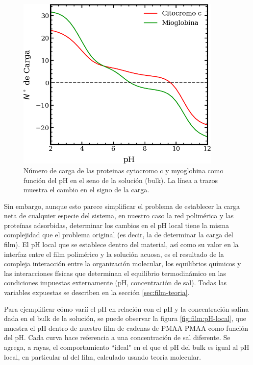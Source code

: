 \begin{figure}
    \centering
    \includegraphics[width=0.9\textwidth]{Figures/graph-film/carga-proteinas.png}
    \caption{N\'umero de carga de las proteinas cytocromo c y myoglobina como  funci\'on del pH en el seno de la soluci\'on (bulk). La l\'inea a trazos muestra el cambio en el signo de la carga.}
    \label{fig:film:protein-charge}
\end{figure}


Sin embargo, aunque esto parece simplificar el problema de establecer la carga neta de cualquier especie del sistema, en nuestro caso la red polim\'erica y las prote\'inas adsorbidas, determinar los cambios en el pH local tiene la misma complejidad que el problema original (es decir, la de determinar la carga del film). El pH local que se establece dentro del material, as\'i como su valor en la interfaz entre el film polim\'erico y la soluci\'on acuosa, es el resultado de la compleja interacci\'on entre la organizaci\'on molecular, los equilibrios qu\'imicos y las interacciones f\'isicas que determinan el equilibrio termodin\'amico en las condiciones impuestas externamente (pH, concentraci\'on de sal). Todas las variables expuestas se describen en la secci\'on \ref{sec:film-teoria}.

Para ejemplificar c\'omo varí\'i el pH en relaci\'on con el pH y la concentraci\'on salina dada en el bulk de la soluci\'on, se puede observar la figura \ref{fig:film:pH-local}, que muestra el pH dentro de nuestro film de cadenas de 
PMAA
PMAA como funci\'on del pH. Cada curva hace referencia a una concentraci\'on de sal diferente. Se agrega, a rayas, el comportamiento ``ideal" en el que el pH del bulk es igual al pH local, en particular al del film, calculado usando teor\'ia molecular.


